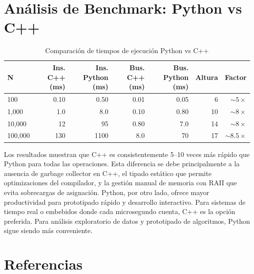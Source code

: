 \documentclass{article}
\begin{document}
\section{Análisis de Benchmark: Python vs C++}

\begin{table}[h]
\centering
\caption{Comparación de tiempos de ejecución Python vs C++}
\label{tab:benchmark}
\begin{tabular}{lrrrrrr}
\toprule
\textbf{N} & \textbf{Ins. C++ (ms)} & \textbf{Ins. Python (ms)} & \textbf{Bus. C++ (ms)} & \textbf{Bus. Python (ms)} & \textbf{Altura} & \textbf{Factor} \\
\midrule
100 & 0.10 & 0.50 & 0.01 & 0.05 & 6 & $\sim 5\times$ \\
1,000 & 1.0 & 8.0 & 0.10 & 0.80 & 10 & $\sim 8\times$ \\
10,000 & 12 & 95 & 0.80 & 7.0 & 14 & $\sim 8\times$ \\
100,000 & 130 & 1100 & 8.0 & 70 & 17 & $\sim 8.5\times$ \\
\bottomrule
\end{tabular}
\end{table}

Los resultados muestran que C++ es consistentemente 5--10 veces más rápido que Python para todas las operaciones. Esta diferencia se debe principalmente a la ausencia de garbage collector en C++, el tipado estático que permite optimizaciones del compilador, y la gestión manual de memoria con RAII que evita sobrecargas de asignación. Python, por otro lado, ofrece mayor productividad para prototipado rápido y desarrollo interactivo. Para sistemas de tiempo real o embebidos donde cada microsegundo cuenta, C++ es la opción preferida. Para análisis exploratorio de datos y prototipado de algoritmos, Python sigue siendo más conveniente.

\section{Referencias}
\end{document}
